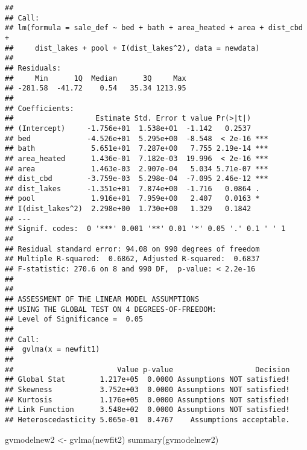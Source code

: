 \documentclass[
]{article}
\newenvironment{Shaded}{\begin{snugshade}}{\end{snugshade}}
\newcommand{\FunctionTok}[1]{\textcolor[rgb]{0.00,0.00,0.00}{#1}}
\newcommand{\NormalTok}[1]{#1}
\newcommand{\OtherTok}[1]{\textcolor[rgb]{0.56,0.35,0.01}{#1}}
\begin{document}
\begin{verbatim}
## 
## Call:
## lm(formula = sale_def ~ bed + bath + area_heated + area + dist_cbd + 
##     dist_lakes + pool + I(dist_lakes^2), data = newdata)
## 
## Residuals:
##     Min      1Q  Median      3Q     Max 
## -281.58  -41.72    0.54   35.34 1213.95 
## 
## Coefficients:
##                   Estimate Std. Error t value Pr(>|t|)    
## (Intercept)     -1.756e+01  1.538e+01  -1.142   0.2537    
## bed             -4.526e+01  5.295e+00  -8.548  < 2e-16 ***
## bath             5.651e+01  7.287e+00   7.755 2.19e-14 ***
## area_heated      1.436e-01  7.182e-03  19.996  < 2e-16 ***
## area             1.463e-03  2.907e-04   5.034 5.71e-07 ***
## dist_cbd        -3.759e-03  5.298e-04  -7.095 2.46e-12 ***
## dist_lakes      -1.351e+01  7.874e+00  -1.716   0.0864 .  
## pool             1.916e+01  7.959e+00   2.407   0.0163 *  
## I(dist_lakes^2)  2.298e+00  1.730e+00   1.329   0.1842    
## ---
## Signif. codes:  0 '***' 0.001 '**' 0.01 '*' 0.05 '.' 0.1 ' ' 1
## 
## Residual standard error: 94.08 on 990 degrees of freedom
## Multiple R-squared:  0.6862, Adjusted R-squared:  0.6837 
## F-statistic: 270.6 on 8 and 990 DF,  p-value: < 2.2e-16
## 
## 
## ASSESSMENT OF THE LINEAR MODEL ASSUMPTIONS
## USING THE GLOBAL TEST ON 4 DEGREES-OF-FREEDOM:
## Level of Significance =  0.05 
## 
## Call:
##  gvlma(x = newfit1) 
## 
##                        Value p-value                   Decision
## Global Stat        1.217e+05  0.0000 Assumptions NOT satisfied!
## Skewness           3.752e+03  0.0000 Assumptions NOT satisfied!
## Kurtosis           1.176e+05  0.0000 Assumptions NOT satisfied!
## Link Function      3.548e+02  0.0000 Assumptions NOT satisfied!
## Heteroscedasticity 5.065e-01  0.4767    Assumptions acceptable.
\end{verbatim}

\begin{Shaded}
\begin{Highlighting}[]
\NormalTok{gvmodelnew2 }\OtherTok{\textless{}{-}} \FunctionTok{gvlma}\NormalTok{(newfit2)}
\FunctionTok{summary}\NormalTok{(gvmodelnew2)}
\end{Highlighting}
\end{Shaded}
\end{document}
